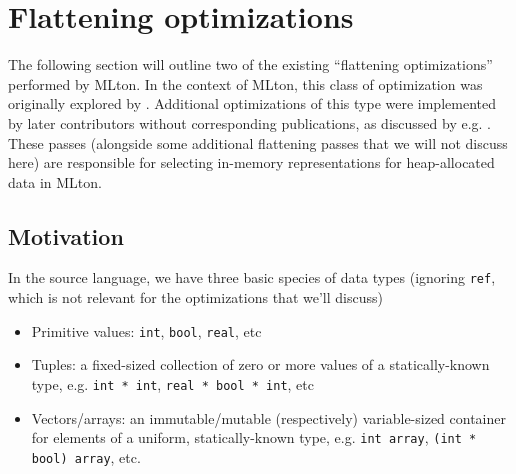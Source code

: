 





\section{Flattening optimizations}
The following section will outline two of the existing ``flattening
optimizations'' performed by MLton. In the context of MLton, this class of
optimization was originally explored by \citet{flat-paper}. Additional
optimizations of this type were implemented by later contributors without
corresponding publications, as discussed by e.g. \citet{deep-flat-email}. These
passes (alongside some additional flattening passes that we will not discuss
here) are responsible for selecting in-memory representations for heap-allocated
data in MLton.

\subsection{Motivation}

In the source language, we have three basic species of data types (ignoring
\texttt{ref}, which is not relevant for the optimizations that we'll discuss)
\begin{itemize}
\item Primitive values: \texttt{int}, \texttt{bool}, \texttt{real}, etc
\item Tuples: a fixed-sized collection of zero or more values of a
  statically-known type, e.g. \texttt{int * int}, \texttt{real * bool * int},
  etc
\item Vectors/arrays: an immutable/mutable (respectively) variable-sized
  container for elements of a uniform, statically-known type, e.g. \texttt{int
    array}, \texttt{(int * bool) array}, etc.
\end{itemize}

